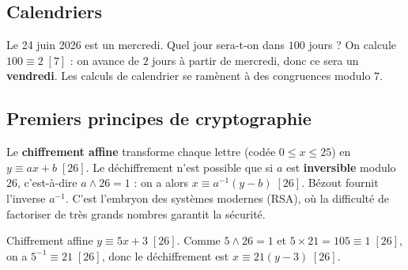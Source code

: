 \begin{illus}
\end{illus}

\subsection{Calendriers}

\begin{exemple}
Le 24 juin 2026 est un mercredi. Quel jour sera-t-on dans $100$ jours ? On calcule
$100\equiv2\;[7]$ : on avance de $2$ jours à partir de mercredi, donc ce sera un
\textbf{vendredi}. Les calculs de calendrier se ramènent à des congruences modulo $7$.
\end{exemple}

\subsection{Premiers principes de cryptographie}

\begin{remarque}
Le \textbf{chiffrement affine} transforme chaque lettre (codée $0\le x\le25$) en
$y\equiv ax+b\;[26]$. Le déchiffrement n'est possible que si $a$ est \textbf{inversible}
modulo $26$, c'est-à-dire $a\wedge26=1$ : on a alors $x\equiv a^{-1}(y-b)\;[26]$. Bézout
fournit l'inverse $a^{-1}$. C'est l'embryon des systèmes modernes (RSA), où la difficulté de
factoriser de très grands nombres garantit la sécurité.
\end{remarque}

\begin{exemple}
Chiffrement affine $y\equiv5x+3\;[26]$. Comme $5\wedge26=1$ et $5\times21=105\equiv1\;[26]$,
on a $5^{-1}\equiv21\;[26]$, donc le déchiffrement est $x\equiv21(y-3)\;[26]$.
\end{exemple}


